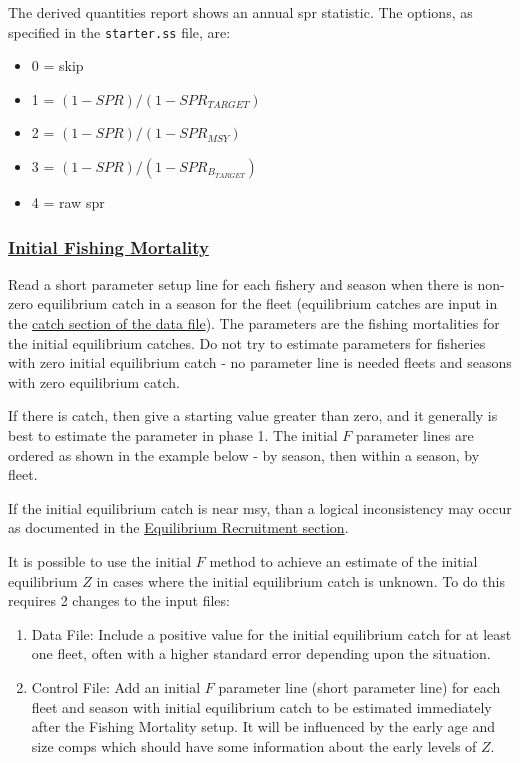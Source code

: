 The derived quantities report shows an annual \gls{spr} statistic. The options, as specified in the \texttt{starter.ss} file, are:
\begin{itemize}
	\item 0 = skip
	\item 1 = $(1-SPR)/(1-SPR_{TARGET})$
	\item 2 = $(1-SPR)/(1-SPR_{MSY})$
	\item 3 = $(1-SPR)/(1-SPR_{B_{TARGET}})$
	\item 4 = raw \gls{spr}
\end{itemize}

\hypertarget{InitF}{}
\subsubsection[Initial Fishing Mortality]{\protect\hyperlink{InitF}{Initial Fishing Mortality}}
Read a short parameter setup line for each fishery and season when there is non-zero equilibrium catch in a season for the fleet (equilibrium catches are input in the \hyperlink{CatchFormat}{catch section of the data file}). The parameters are the fishing mortalities for the initial equilibrium catches. Do not try to estimate parameters for fisheries with zero initial equilibrium catch - no parameter line is needed fleets and seasons with zero equilibrium catch.

If there is catch, then give a starting value greater than zero, and it generally is best to estimate the parameter in phase 1. The initial $F$ parameter lines are ordered as shown in the example below - by season, then within a season, by fleet.

If the initial equilibrium catch is near \gls{msy}, than a logical inconsistency may occur as documented in the \hyperlink{EquilRecr}{Equilibrium Recruitment section}. 

It is possible to use the initial $F$ method to achieve an estimate of the initial equilibrium $Z$ in cases where the initial equilibrium catch is unknown. To do this requires 2 changes to the input files:
\begin{enumerate}
	\item Data File: Include a positive value for the initial equilibrium catch for at least one fleet, often with a higher standard error depending upon the situation.
	\item Control File: Add an initial $F$ parameter line (short parameter line) for each fleet and season with initial equilibrium catch to be estimated immediately after the Fishing Mortality setup. It will be influenced by the early age and size comps which should have some information about the early levels of $Z$.
\end{enumerate}

